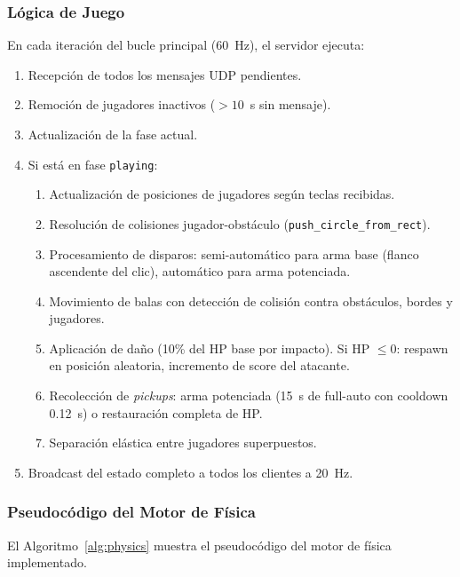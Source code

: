 \documentclass[conference]{IEEEtran}
\begin{document}
\subsubsection{L\'ogica de Juego}

En cada iteraci\'on del bucle principal (60~Hz), el servidor ejecuta:

\begin{enumerate}
    \item Recepci\'on de todos los mensajes UDP pendientes.
    \item Remoci\'on de jugadores inactivos ($> 10$~s sin mensaje).
    \item Actualizaci\'on de la fase actual.
    \item Si est\'a en fase \texttt{playing}:
    \begin{enumerate}
        \item Actualizaci\'on de posiciones de jugadores seg\'un teclas recibidas.
        \item Resoluci\'on de colisiones jugador-obst\'aculo (\texttt{push\_circle\_from\_rect}).
        \item Procesamiento de disparos: semi-autom\'atico para arma base (flanco ascendente del clic), autom\'atico para arma potenciada.
        \item Movimiento de balas con detecci\'on de colisi\'on contra obst\'aculos, bordes y jugadores.
        \item Aplicaci\'on de da\~no (10\% del HP base por impacto). Si HP $\leq 0$: respawn en posici\'on aleatoria, incremento de score del atacante.
        \item Recolecci\'on de \textit{pickups}: arma potenciada (15~s de full-auto con cooldown 0.12~s) o restauraci\'on completa de HP.
        \item Separaci\'on el\'astica entre jugadores superpuestos.
    \end{enumerate}
    \item Broadcast del estado completo a todos los clientes a 20~Hz.
\end{enumerate}

\subsubsection{Pseudoc\'odigo del Motor de F\'isica}

El Algoritmo~\ref{alg:physics} muestra el pseudoc\'odigo del motor de f\'isica implementado.
\end{document}
